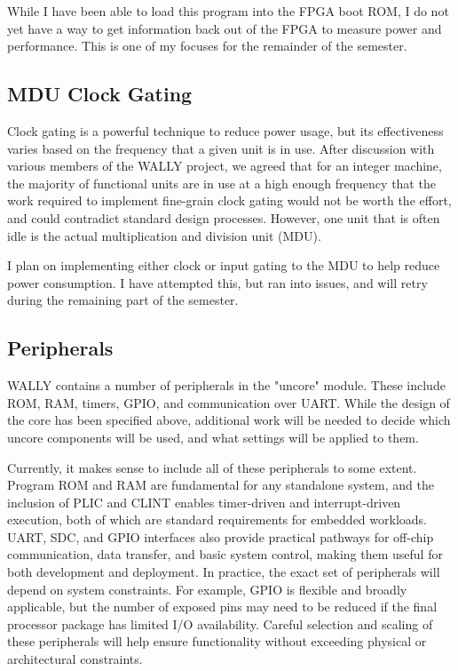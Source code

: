 \documentclass[conference]{IEEEtran}
\begin{document}
While I have been able to load this program into the FPGA boot ROM, I do not yet have a way to get information back out of the FPGA to measure power and performance. This is one of my focuses for the remainder of the semester.


\subsection{MDU Clock Gating}

Clock gating is a powerful technique to reduce power usage, but its effectiveness varies based on the frequency that a given unit is in use. After discussion with various members of the WALLY project, we agreed that for an integer machine, the majority of functional units are in use at a high enough frequency that the work required to implement fine-grain clock gating would not be worth the effort, and could contradict standard design processes. However, one unit that is often idle is the actual multiplication and division unit (MDU).

I plan on implementing either clock or input gating to the MDU to help reduce power consumption. I have attempted this, but ran into issues, and will retry during the remaining part of the semester.

\subsection{Peripherals}
WALLY contains a number of peripherals in the "uncore" module. These include ROM, RAM, timers, GPIO, and communication over UART. While the design of the core has been specified above, additional work will be needed to decide which uncore components will be used, and what settings will be applied to them.

Currently, it makes sense to include all of these peripherals to some extent. Program ROM and RAM are fundamental for any standalone system, and the inclusion of PLIC and CLINT enables timer-driven and interrupt-driven execution, both of which are standard requirements for embedded workloads. UART, SDC, and GPIO interfaces also provide practical pathways for off-chip communication, data transfer, and basic system control, making them useful for both development and deployment. In practice, the exact set of peripherals will depend on system constraints. For example, GPIO is flexible and broadly applicable, but the number of exposed pins may need to be reduced if the final processor package has limited I/O availability. Careful selection and scaling of these peripherals will help ensure functionality without exceeding physical or architectural constraints.
\end{document}
